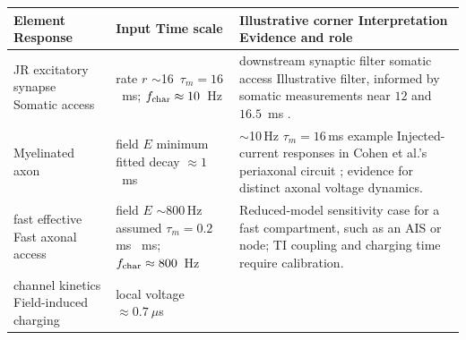 \documentclass[11pt,a4paper]{article}
\providecommand{\DIFaddtex}[1]{{\protect\color{blue} \sf #1}} %
\providecommand{\DIFdeltex}[1]{{\protect\color{red} \scriptsize #1}} %
\providecommand{\DIFaddFL}[1]{\DIFadd{#1}} %
\providecommand{\DIFdelFL}[1]{\DIFdel{#1}} %
\providecommand{\DIFaddbeginFL}{} %
\providecommand{\DIFaddendFL}{} %
\providecommand{\DIFdelbeginFL}{} %
\providecommand{\DIFdelendFL}{} %
\providecommand{\DIFadd}[1]{\texorpdfstring{\DIFaddtex{#1}}{#1}} %
\providecommand{\DIFdel}[1]{\texorpdfstring{\DIFdeltex{#1}}{}} %
\begin{document}
\begin{table}[h]
\centering\small
\renewcommand{\arraystretch}{1.15}
\DIFdelbeginFL %
\DIFdelendFL \DIFaddbeginFL \begin{tabular}{@{}>{\raggedright\arraybackslash}p{2.8cm}
>{\raggedright\arraybackslash}p{3.5cm}
>{\raggedright\arraybackslash}p{8.6cm}@{}}
\DIFaddendFL \toprule
\DIFdelbeginFL \DIFdelFL{Element }\DIFdelendFL \DIFaddbeginFL \DIFaddFL{Response }\DIFaddendFL & \DIFdelbeginFL \DIFdelFL{Input }\DIFdelendFL \DIFaddbeginFL \DIFaddFL{Time scale }\DIFaddendFL & \DIFdelbeginFL \DIFdelFL{Illustrative corner }%
\DIFdelFL{Interpretation }\DIFdelendFL \DIFaddbeginFL \DIFaddFL{Evidence and role }\DIFaddendFL \\
\midrule
\DIFdelbeginFL \DIFdelFL{JR excitatory synapse }\DIFdelendFL \DIFaddbeginFL \DIFaddFL{Somatic access }\DIFaddendFL & \DIFdelbeginFL \DIFdelFL{rate $r$ }%
\DIFdelFL{$\sim$16\,}\DIFdelendFL \DIFaddbeginFL \DIFaddFL{$\tau_m=16$~ms; $f_{\rm char}\approx10$~}\DIFaddendFL Hz &
\DIFdelbeginFL \DIFdelFL{downstream synaptic filter}%
\DIFdelFL{somatic access }\DIFdelendFL \DIFaddbeginFL \DIFaddFL{Illustrative filter, informed by somatic measurements near $12$ and $16.5$~ms
\cite{deitcher2017,eyal2016}. }\\
\DIFaddFL{Myelinated axon }\DIFaddendFL & \DIFdelbeginFL \DIFdelFL{field $E$ }\DIFdelendFL \DIFaddbeginFL \DIFaddFL{minimum fitted decay $\approx1$~ms }\DIFaddendFL &
\DIFdelbeginFL \DIFdelFL{$\sim$10\,Hz }%
\DIFdelFL{$\tau_m=16$\,ms example }\DIFdelendFL \DIFaddbeginFL \DIFaddFL{Injected-current responses in Cohen et al.'s periaxonal circuit
\cite{cohen2020periaxonal}; evidence for distinct axonal voltage dynamics. }\DIFaddendFL \\
\DIFdelbeginFL \DIFdelFL{fast effective }\DIFdelendFL \DIFaddbeginFL \DIFaddFL{Fast axonal }\DIFaddendFL access & \DIFdelbeginFL \DIFdelFL{field $E$ }%
\DIFdelFL{$\sim$800\,Hz }%
\DIFdelendFL assumed $\tau_m=0.2$\DIFdelbeginFL \DIFdelFL{\,ms}\DIFdelendFL \DIFaddbeginFL \DIFaddFL{~ms; $f_{\rm char}\approx800$~Hz }&
\DIFaddFL{Reduced-model sensitivity case for a fast compartment, such as an AIS or node;
TI coupling and charging time require calibration. }\DIFaddendFL \\
\DIFdelbeginFL \DIFdelFL{channel kinetics }\DIFdelendFL \DIFaddbeginFL \DIFaddFL{Field-induced charging }\DIFaddendFL & \DIFdelbeginFL \DIFdelFL{local voltage }\DIFdelendFL \DIFaddbeginFL \DIFaddFL{$\approx0.7~\mu$s }\DIFaddendFL &

\end{tabular}
\end{table}
\end{document}
